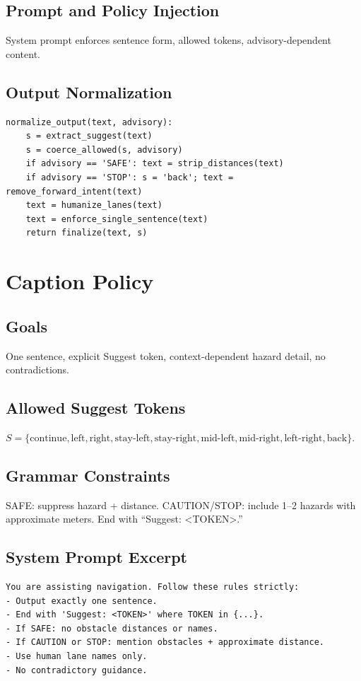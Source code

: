 \documentclass[11pt,a4paper]{article}
\begin{document}
\subsection{Prompt and Policy Injection}
System prompt enforces sentence form, allowed tokens, advisory-dependent content.

\subsection{Output Normalization}
\begin{lstlisting}[style=code]
normalize_output(text, advisory):
    s = extract_suggest(text)
    s = coerce_allowed(s, advisory)
    if advisory == 'SAFE': text = strip_distances(text)
    if advisory == 'STOP': s = 'back'; text = remove_forward_intent(text)
    text = humanize_lanes(text)
    text = enforce_single_sentence(text)
    return finalize(text, s)
\end{lstlisting}

\section{Caption Policy}
\subsection{Goals}
One sentence, explicit Suggest token, context-dependent hazard detail, no contradictions.

\subsection{Allowed Suggest Tokens}
$S=\{\text{continue},\text{left},\text{right},\text{stay-left},\text{stay-right},\text{mid-left},\text{mid-right},\text{left-right},\text{back}\}$. 

\subsection{Grammar Constraints}
SAFE: suppress hazard + distance. CAUTION/STOP: include 1--2 hazards with approximate meters. End with ``Suggest: <TOKEN>.''

\subsection{System Prompt Excerpt}
\begin{lstlisting}[style=code]
You are assisting navigation. Follow these rules strictly:
- Output exactly one sentence.
- End with 'Suggest: <TOKEN>' where TOKEN in {...}.
- If SAFE: no obstacle distances or names.
- If CAUTION or STOP: mention obstacles + approximate distance.
- Use human lane names only.
- No contradictory guidance.
\end{lstlisting}
\end{document}
